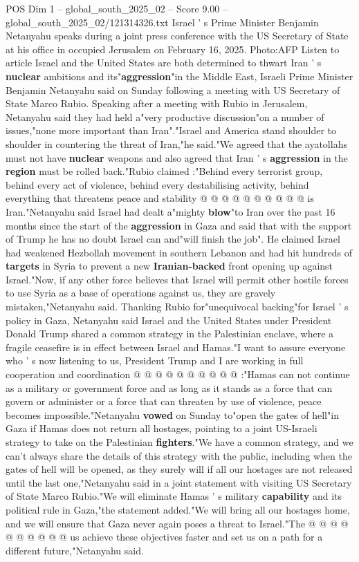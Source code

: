 \begin{textsample}{POS Dim 1 – global\_south\_2025\_02 – Score 9.00 – global\_south\_2025\_02/121314326.txt}  \label{ex:f1_pos_370}
Israel ' s Prime Minister Benjamin Netanyahu speaks during a joint press conference with the US Secretary of State at his office in occupied Jerusalem on February 16, 2025.
Photo:AFP Listen to article Israel and the United States are both determined to thwart Iran ' s \textbf{nuclear} ambitions and its"\textbf{aggression}"in the Middle East, Israeli Prime Minister Benjamin Netanyahu said on Sunday following a meeting with US Secretary of State Marco Rubio.
Speaking after a meeting with Rubio in Jerusalem, Netanyahu said they had held a"very productive discussion"on a number of issues,"none more important than Iran"."Israel and America stand shoulder to shoulder in countering the threat of Iran,"he said."We agreed that the ayatollahs must not have \textbf{nuclear} weapons and also agreed that Iran ' s \textbf{aggression} in the \textbf{region} must be rolled back."Rubio claimed :"Behind every terrorist group, behind every act of violence, behind every destabilising activity, behind everything that threatens peace and stability @ @ @ @ @ @ @ @ @ @ is Iran."Netanyahu said Israel had dealt a"mighty \textbf{blow}"to Iran over the past 16 months since the start of the \textbf{aggression} in Gaza and said that with the support of Trump he has no doubt Israel can and"will finish the job".
He claimed Israel had weakened Hezbollah movement in southern Lebanon and had hit hundreds of \textbf{targets} in Syria to prevent a new \textbf{Iranian-backed} front opening up against Israel."Now, if any other force believes that Israel will permit other hostile forces to use Syria as a base of operations against us, they are gravely mistaken,"Netanyahu said.
Thanking Rubio for"unequivocal backing"for Israel ' s policy in Gaza, Netanyahu said Israel and the United States under President Donald Trump shared a common strategy in the Palestinian enclave, where a fragile ceasefire is in effect between Israel and Hamas."I want to assure everyone who ' s now listening to us, President Trump and I are working in full cooperation and coordination @ @ @ @ @ @ @ @ @ @ :"Hamas can not continue as a military or government force and as long as it stands as a force that can govern or administer or a force that can threaten by use of violence, peace becomes impossible."Netanyahu \textbf{vowed} on Sunday to"open the gates of hell"in Gaza if Hamas does not return all hostages, pointing to a joint US-Israeli strategy to take on the Palestinian \textbf{fighters}."We have a common strategy, and we can't always share the details of this strategy with the public, including when the gates of hell will be opened, as they surely will if all our hostages are not released until the last one,"Netanyahu said in a joint statement with visiting US Secretary of State Marco Rubio."We will eliminate Hamas ' s military \textbf{capability} and its political rule in Gaza,"the statement added."We will bring all our hostages home, and we will ensure that Gaza never again poses a threat to Israel."The @ @ @ @ @ @ @ @ @ @ us achieve these objectives faster and set us on a path for a different future,"Netanyahu said.

\end{textsample}
